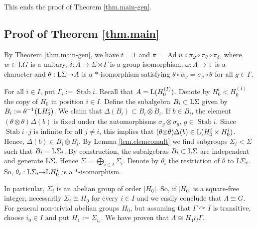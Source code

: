 \documentclass[a4paper,11pt]{amsart}
\numberwithin{equation}{section}
\begin{document}
This ends the proof of Theorem \ref{thm.main-gen}.\hfill\qedsymbol

\subsection*{Proof of Theorem \ref{thm.main}}\mbox{}

By Theorem \ref{thm.main-gen}, we have $t=1$ and $\pi = {\operatorname{Ad}} w \circ \pi_{\omega} \circ \pi_\theta \circ \pi_\delta$, where $w \in {\mathord{\text{\rm L}}} G$ is a unitary, $\delta : \Lambda {\rightarrow} \Sigma \rtimes \Gamma$ is a group isomorphism, ${\omega} : \Lambda {\rightarrow} {\mathbb{T}}$ is a character and $\theta : {\mathord{\text{\rm L}}} \Sigma {\rightarrow} A$ is a $*$-isomorphism satisfying $\theta \circ {\alpha}_g = {\sigma}_g \circ \theta$ for all $g \in \Gamma$.

For all $i \in I$, put $\Gamma_i := {\operatorname{Stab}} i$. Recall that $A = {\mathord{\text{\rm L}}}(H_0^{(I)})$. Denote by $H_0^i < H_0^{(I)}$ the copy of $H_0$ in position $i \in I$. Define the subalgebra $B_i \subset {\mathord{\text{\rm L}}} \Sigma$ given by $B_i := \theta^{-1}\bigl( {\mathord{\text{\rm L}}} H_0^i \bigr)$.
We claim that ${\Delta}(B_i) \subset B_i {\mathbin{\overline{\otimes}}} B_i$. If $b \in B_i$, the element $(\theta {\otimes} \theta){\Delta}(b)$ is fixed under the automorphisms ${\sigma}_g {\otimes} {\sigma}_g$, $g \in {\operatorname{Stab}} i$. Since ${\operatorname{Stab}} i \cdot j$ is infinite for all $j \neq i$, this implies that $(\theta {\otimes} \theta){\Delta}(b) \in {\mathord{\text{\rm L}}}(H_0^i \times H_0^i)$. Hence, ${\Delta}(b) \in B_i {\mathbin{\overline{\otimes}}} B_i$. By Lemma \ref{lem.elemcomult} we find subgroups $\Sigma_i < \Sigma$ such that $B_i = {\mathord{\text{\rm L}}} \Sigma_i$. By construction, the subalgebras $B_i \subset {\mathord{\text{\rm L}}} \Sigma$ are independent and generate ${\mathord{\text{\rm L}}} \Sigma$. Hence $\Sigma = \bigoplus_{i \in I} \Sigma_i$. Denote by $\theta_i$ the restriction of $\theta$ to ${\mathord{\text{\rm L}}} \Sigma_i$. So, $\theta_i : {\mathord{\text{\rm L}}} \Sigma_i {\rightarrow} {\mathord{\text{\rm L}}} H_0^i$ is a $*$-isomorphism.

In particular, $\Sigma_i$ is an abelian group of order $|H_0|$. So, if $|H_0|$ is a square-free integer, necessarily $\Sigma_i \cong H_0$ for every $i \in I$ and we easily conclude that $\Lambda \cong G$. For general non-trivial abelian groups $H_0$, but assuming that $\Gamma {\curvearrowright} I$ is transitive, choose $i_0 \in I$ and put $H_1 := \Sigma_{i_0}$. We have proven that $\Lambda \cong H_1 \wr_I \Gamma$.
\end{document}
